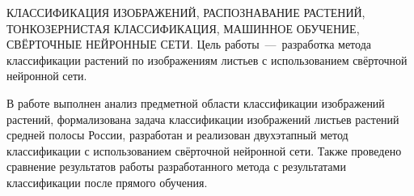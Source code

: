 \begin{essay}{КЛАССИФИКАЦИЯ ИЗОБРАЖЕНИЙ, РАСПОЗНАВАНИЕ РАСТЕНИЙ, ТОНКОЗЕРНИСТАЯ КЛАССИФИКАЦИЯ, МАШИННОЕ ОБУЧЕНИЕ, СВЁРТОЧНЫЕ НЕЙРОННЫЕ СЕТИ.}
Цель работы~---~разработка метода классификации растений по изображениям листьев с использованием свёрточной нейронной сети.

В работе выполнен анализ предметной области классификации изображений растений, формализована задача классификации изображений листьев растений средней полосы России, разработан и реализован двухэтапный метод классификации с использованием свёрточной нейронной сети. Также проведено сравнение результатов работы разработанного метода с результатами классификации после прямого обучения.
\end{essay}
